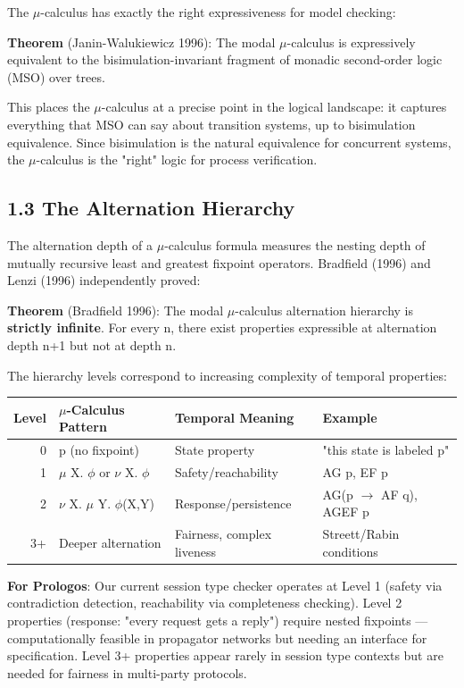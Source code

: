 \documentclass[11pt]{article}
\begin{document}
The \(\mu\)-calculus has exactly the right expressiveness for model checking:

\textbf{Theorem} (Janin-Walukiewicz 1996): The modal \(\mu\)-calculus is expressively
equivalent to the bisimulation-invariant fragment of monadic second-order logic
(MSO) over trees.

This places the \(\mu\)-calculus at a precise point in the logical landscape: it
captures everything that MSO can say about transition systems, up to
bisimulation equivalence. Since bisimulation is the natural equivalence for
concurrent systems, the \(\mu\)-calculus is the "right" logic for process
verification.
\subsection{1.3 The Alternation Hierarchy}
\label{sec:orge4900ce}

The alternation depth of a \(\mu\)-calculus formula measures the nesting depth of
mutually recursive least and greatest fixpoint operators. Bradfield (1996) and
Lenzi (1996) independently proved:

\textbf{Theorem} (Bradfield 1996): The modal \(\mu\)-calculus alternation hierarchy is
\textbf{strictly infinite}. For every n, there exist properties expressible at
alternation depth n+1 but not at depth n.

The hierarchy levels correspond to increasing complexity of temporal properties:

\begin{center}
\begin{tabular}{rlll}
Level & \(\mu\)-Calculus Pattern & Temporal Meaning & Example\\
\hline
0 & p (no fixpoint) & State property & "this state is labeled p"\\
1 & \(\mu\) X. \(\phi\) or \(\nu\) X. \(\phi\) & Safety/reachability & AG p, EF p\\
2 & \(\nu\) X. \(\mu\) Y. \(\phi\)(X,Y) & Response/persistence & AG(p \(\to\) AF q), AGEF p\\
3+ & Deeper alternation & Fairness, complex liveness & Streett/Rabin conditions\\
\end{tabular}
\end{center}

\textbf{For Prologos}: Our current session type checker operates at Level 1 (safety
via contradiction detection, reachability via completeness checking). Level 2
properties (response: "every request gets a reply") require nested fixpoints
--- computationally feasible in propagator networks but needing an interface
for specification. Level 3+ properties appear rarely in session type contexts
but are needed for fairness in multi-party protocols.
\end{document}
